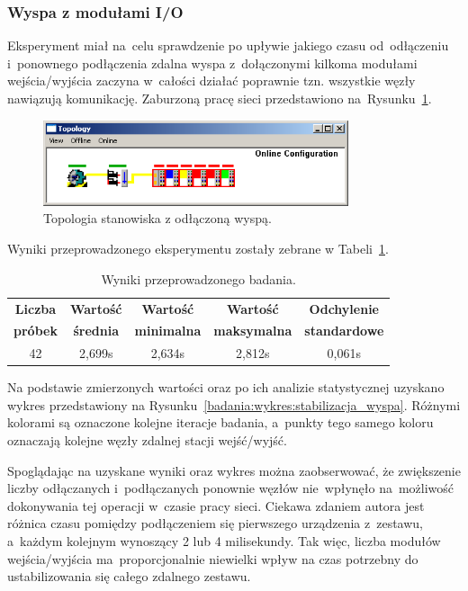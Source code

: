 \subsubsection{Wyspa z modułami I/O}
Eksperyment miał na~celu sprawdzenie po upływie jakiego czasu od~odłączeniu i~ponownego podłączenia zdalna wyspa z~dołączonymi kilkoma modułami wejścia/wyjścia zaczyna w~całości działać poprawnie tzn. wszystkie węzły nawiązują komunikację. Zaburzoną pracę sieci przedstawiono na~Rysunku~\ref{coupler}.
\begin{figure}[!htb] 	\centering 	\includegraphics[width=0.8\textwidth]{images/topologyCPerror} \caption{Topologia stanowiska z odłączoną wyspą.} \label{coupler} \end{figure}

Wyniki przeprowadzonego eksperymentu zostały zebrane w Tabeli~\ref{badania:wyniki:stabilizacja_wyspa}.
\begin{table}[!htb]
\begin{center}
\begin{tabular}{| c | c | c | c | c |}\hline
\textbf{Liczba} & \textbf{Wartość} & \textbf{Wartość} & \textbf{Wartość} & \textbf{Odchylenie} \\
\textbf{próbek} & \textbf{średnia} & \textbf{minimalna} & \textbf{maksymalna} & \textbf{standardowe} \\\hline\hline
42 & 2,699s & 2,634s & 2,812s & 0,061s \\\hline
\end{tabular}
\end{center}
\vspace*{-6mm}
  \caption{Wyniki przeprowadzonego badania.}
	\label{badania:wyniki:stabilizacja_wyspa}
\end{table}

Na podstawie zmierzonych wartości oraz po ich analizie statystycznej uzyskano wykres przedstawiony na Rysunku~\ref{badania:wykres:stabilizacja_wyspa}. Różnymi kolorami są oznaczone kolejne iteracje badania, a~punkty tego samego koloru oznaczają kolejne węzły zdalnej stacji wejść/wyjść.


Spoglądając na uzyskane wyniki oraz wykres można zaobserwować, że zwiększenie liczby odłączanych i~podłączanych ponownie węzłów nie~wpłynęło na~możliwość dokonywania tej operacji w~czasie pracy sieci. Ciekawa zdaniem autora jest różnica czasu pomiędzy podłączeniem się pierwszego urządzenia z~zestawu, a~każdym kolejnym wynoszący 2 lub 4 milisekundy. Tak więc, liczba modułów wejścia/wyjścia ma~proporcjonalnie niewielki wpływ na czas potrzebny do ustabilizowania się całego zdalnego zestawu.

